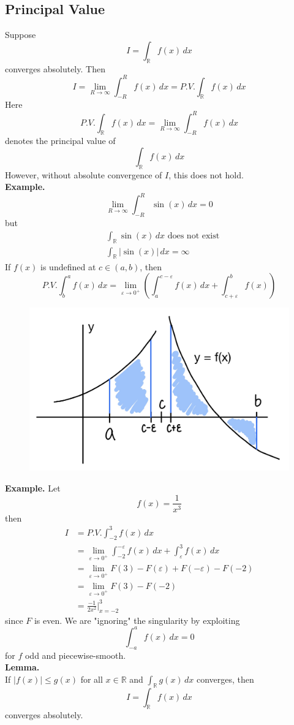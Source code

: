 \documentclass[11pt]{article}
\begin{document}
\subsection{Principal Value}
Suppose 
$$ I = \int_{\mathbb{R}}f(x) \,dx$$
converges absolutely. Then
$$ I = \lim_{R\to\infty}\int_{-R}^{R}f(x) \, dx = P.V.\int_{\mathbb{R}}f(x) \, dx$$
Here 
$$ P.V.\int_{\mathbb{R}}f(x) \, dx = \lim_{R\to\infty}\int_{-R}^{R}f(x) \, dx $$ 
denotes the principal value of 
$$ \int_{\mathbb{R}}f(x)\, dx$$
However, without absolute convergence of $I$, this does not hold. \\
\newline
\textbf{Example.}
$$ \lim_{R \to \infty} \int_{-R} ^{R} \sin(x) \,dx = 0$$
but 
\begin{align*}
& \int_{\mathbb{R}}\sin(x) \, dx \text{ does not exist} \\
& \int_{\mathbb{R}}|\sin(x)| \,dx = \infty
\end{align*}
If $f(x)$ is undefined at $c \in (a, b)$, then 
$$ P.V. \int_b^a f(x) \, dx = \lim_{\varepsilon \to 0^+}\left(\int_{a}^{c - \varepsilon}f(x) \, dx + \int_{c + \varepsilon}^b f(x) \right)$$
\begin{figure}[h]
\includegraphics[scale=0.17]{21_1} 
\centering
\end{figure}
\newpage
\textbf{Example.} Let 
$$ f(x) = \frac{1}{x^3}$$
then 
\begin{align*}
I &= P.V.\int_{-2}^{3}f(x) \, dx \\
& = \lim_{\varepsilon \to 0^+} {\int_{-2}^{-\varepsilon} f(x)\, dx + \int_{\varepsilon}^3 f(x) \, dx} \\
& = \lim_{\varepsilon \to 0^+} {F(3) - F(\varepsilon) + F(-\varepsilon) - F(-2)} \\
& = \lim_{\varepsilon \to 0^+} {F(3) - F(-2)} \\
& = \frac{-1}{2x^2} \bigg\rvert_{x = -2}^{3}
\end{align*}
since $F$ is even. We are "ignoring" the singularity by exploiting 
$$ \int_{-a}^{a}f(x) \, dx = 0$$
for $f$ odd and piecewise-smooth. \\
\newline
\textbf{Lemma.} \\
If $|f(x)| \leqslant g(x)$ for all $x \in \mathbb{R}$ and $\int_{\mathbb{R}}g(x) \, dx$ converges, then 
$$ I = \int_{\mathbb{R}} f(x) \, dx$$ 
converges absolutely. 
\end{document}
